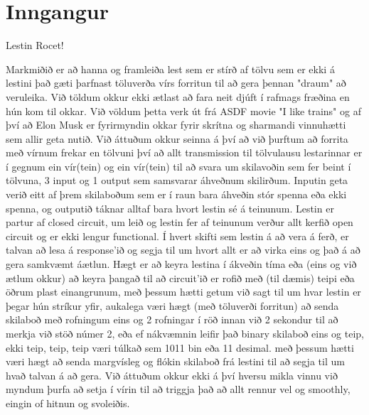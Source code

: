\section{Inngangur}
Lestin Rocet!

Markmiðið er að hanna og framleiða lest sem er stírð af tölvu sem er ekki á lestini
það gæti þarfnast töluverða vírs forritun til að gera þennan "draum" að veruleika.
Við töldum okkur ekki ætlast að fara neit djúft í rafmags fræðina en hún kom til okkar.
Við völdum þetta verk út frá ASDF movie "I like trains" og af því að Elon Musk er 
fyrirmyndin okkar fyrir skrítna og sharmandi vinnuhætti sem allir geta nutið.
Við áttuðum okkur seinna á því að við þurftum að forrita með vírnum frekar en tölvuni
því að allt transmission til tölvulausu lestarinnar er í gegnum ein vír(tein) og 
ein vír(tein) til að svara um skilavoðin sem fer beint í tölvuna,
3 input og 1 output sem samsvarar áhveðnum skilirðum.
Inputin geta verið eitt af þrem skilaboðum sem er í raun bara áhveðin stór spenna
eða ekki spenna, og outputið táknar alltaf bara hvort lestin sé á teinunum.
Lestin er partur af closed circuit, um leið og lestin fer af teinunum verður 
allt kerfið open circuit og er ekki lengur functional.
Í hvert skifti sem lestin á að vera á ferð, er talvan að lesa á response'ið og 
segja til um hvort allt er að virka eins og það á að gera samkvæmt áætlun.
Hægt er að keyra lestina í ákveðin tíma eða (eins og við ætlum okkur) að keyra 
þangað til að circuit'ið er rofið með (til dæmis) teipi eða öðrum plast einangrunum,
með þessum hætti getum við sagt til um hvar lestin er þegar hún stríkur yfir, 
aukalega væri hægt (með töluverði forritun) að senda skilaboð með rofningum
eins og 2 rofningar í röð innan við 2 sekondur  til að merkja við stöð númer 2,
eða ef nákvæmnin leifir það binary skilaboð eins og teip, ekki teip, teip, teip
væri túlkað sem 1011 bin eða 11 desimal. með þessum hætti væri hægt að senda margvísleg
og flókin skilaboð frá lestini til að segja til um hvað talvan á að gera.
Við áttuðum okkur ekki á því hversu mikla vinnu við myndum þurfa að setja í vírin til
að triggja það að allt rennur vel og smoothly, eingin of hitnun og svoleiðis.
